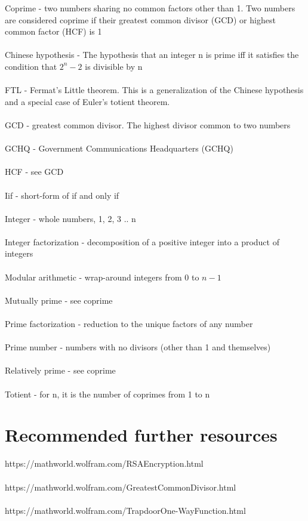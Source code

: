 \documentclass[11pt]{article}   	%
\begin{document}
Coprime - two numbers sharing no common factors other than 1. Two numbers are considered coprime if their greatest common divisor (GCD) or highest common factor (HCF) is 1 \\
\\
Chinese hypothesis - The hypothesis that an integer n is prime iff it satisfies the condition that $ 2^n - 2 $ is divisible by n \\
\\
FTL - Fermat's Little theorem. This is a generalization of the Chinese hypothesis and a special case of Euler's totient theorem. \\
\\
GCD - greatest common divisor. The highest divisor common to two numbers \\
\\
GCHQ - Government Communications Headquarters (GCHQ) \\
\\
HCF - see GCD \\
\\
Iif - short-form of if and only if \\
\\
Integer - whole numbers, 1, 2, 3 .. n \\
\\
Integer factorization - decomposition of a positive integer into a product of integers \\
\\
Modular arithmetic - wrap-around integers from 0 to $ n - 1 $ \\
\\
Mutually prime - see coprime \\
\\
Prime factorization - reduction to the unique factors of any number \\
\\
Prime number - numbers with no divisors (other than 1 and themselves) \\
\\
Relatively prime - see coprime \\
\\
Totient - for n, it is the number of coprimes from 1 to n \\


\break

\section*{Recommended further resources}

https://mathworld.wolfram.com/RSAEncryption.html \\
\\
https://mathworld.wolfram.com/GreatestCommonDivisor.html \\
\\
https://mathworld.wolfram.com/TrapdoorOne-WayFunction.html
\end{document}
